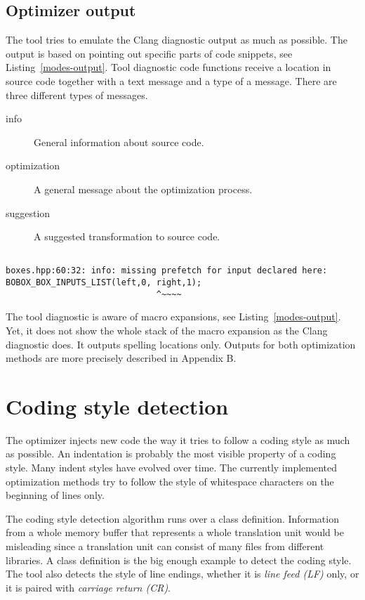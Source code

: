 \subsection{Optimizer output}
The tool tries to emulate the Clang diagnostic output as much as possible. The output is based on pointing out specific parts of code snippets, see Listing~\ref{modes-output}. Tool diagnostic code functions receive a location in source code together with a text message and a type of a message. There are three different types of messages.

\begin{description}
\item[info]{General information about source code.}
\item[optimization]{A general message about the optimization process.}
\item[suggestion]{A suggested transformation to source code.}
\end{description}

\begin{lstlisting}[caption={An example of the tool diagnostic output.},label={modes-output}]

boxes.hpp:60:32: info: missing prefetch for input declared here:
BOBOX_BOX_INPUTS_LIST(left,0, right,1);
                              ^~~~~
\end{lstlisting}

The tool diagnostic is aware of macro expansions, see Listing~\ref{modes-output}. Yet, it does not show the whole stack of the macro expansion as the Clang diagnostic does. It outputs spelling locations only. Outputs for both optimization methods are more precisely described in Appendix B.

\section{Coding style detection}
The optimizer injects new code the way it tries to follow a coding style as much as possible. An indentation is probably the most visible property of a coding style. Many indent styles have evolved over time. The currently implemented optimization methods try to follow the style of whitespace characters on the beginning of lines only.

The coding style detection algorithm runs over a class definition. Information from a whole memory buffer that represents a whole translation unit would be misleading since a translation unit can consist of many files from different libraries. A class definition is the big enough example to detect the coding style. The tool also detects the style of line endings, whether it is \emph{line feed (LF)} only, or it is paired with \emph{carriage return (CR)}.


